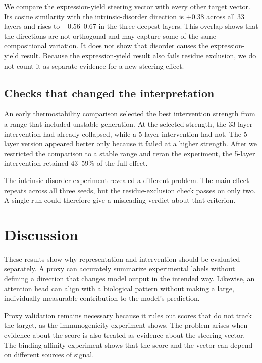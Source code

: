 \documentclass{article}
\begin{document}
We compare the expression-yield steering vector with every other target
vector. Its cosine similarity with the intrinsic-disorder direction is
$+0.38$ across all 33 layers and rises to $+0.56$--$0.67$ in the three
deepest layers. This overlap shows that the directions are not orthogonal
and may capture some of the same compositional variation. It does not
show that disorder causes the expression-yield result. Because the
expression-yield result also fails residue exclusion, we do not count it
as separate evidence for a new steering effect.

\subsection{Checks that changed the interpretation}

An early thermostability comparison selected the best intervention
strength from a range that included unstable generation. At the selected
strength, the 33-layer intervention had already collapsed, while a
5-layer intervention had not. The 5-layer version appeared better only
because it failed at a higher strength. After we restricted the
comparison to a stable range and reran the experiment, the 5-layer
intervention retained 43--59\% of the full effect.

The intrinsic-disorder experiment revealed a different problem. The main
effect repeats across all three seeds, but the residue-exclusion check
passes on only two. A single run could therefore give a misleading
verdict about that criterion.

\section{Discussion}

These results show why representation and intervention should be
evaluated separately. A proxy can accurately summarize experimental
labels without defining a direction that changes model output in the
intended way. Likewise, an attention head can align with a biological
pattern without making a large, individually measurable contribution to
the model's prediction.

Proxy validation remains necessary because it rules out scores that do
not track the target, as the immunogenicity experiment shows. The problem
arises when evidence about the score is also treated as evidence about
the steering vector. The binding-affinity experiment shows that the score
and the vector can depend on different sources of signal.
\end{document}
